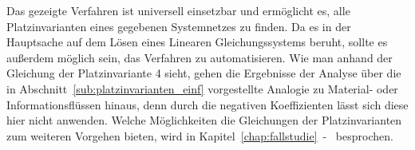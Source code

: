 		Das gezeigte Verfahren ist universell einsetzbar und ermöglicht es, alle Platzinvarianten eines gegebenen Systemnetzes zu finden. Da es in der Hauptsache auf dem Lösen eines Linearen Gleichungssystems beruht, sollte es außerdem möglich sein, das Verfahren zu automatisieren. Wie man anhand der Gleichung der Platzinvariante 4 sieht, gehen die Ergebnisse der Analyse über die in Abschnitt~\ref{sub:platzinvarianten_einf} vorgestellte Analogie zu Material- oder Informationsflüssen hinaus, denn durch die negativen Koeffizienten lässt sich diese hier nicht anwenden. Welche Möglichkeiten die Gleichungen der Platzinvarianten zum weiteren Vorgehen bieten, wird in Kapitel~\ref{chap:fallstudie}~-~ besprochen. 




























































































